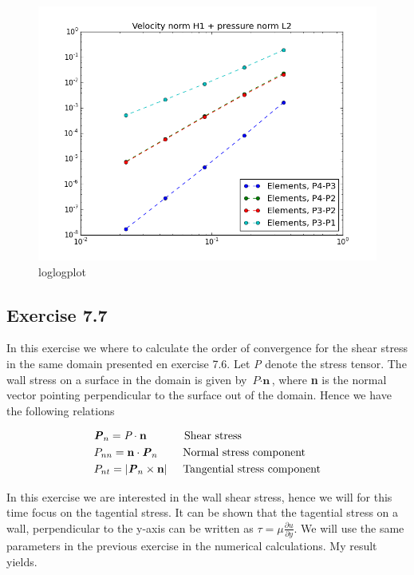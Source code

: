 \documentclass[a4paper,norsk]{article}
\begin{document}
\begin{figure}[h!]
	\centering
	\caption*{loglogplot}
	\includegraphics[scale=0.5]{comb.png}
\end{figure}

\newpage
\subsection{Exercise 7.7}
In this exercise we where to calculate the order of convergence for the shear stress in the same domain presented en exercise 7.6.
Let \textit{P} denote the stress tensor. The wall stress on a surface in the domain is given by $\textit{P} \cdot \textbf{n}$, where \textbf{n} is the normal vector
pointing perpendicular to the surface out of the domain. Hence we have the following relations

\begin{align*}
 &\textbf{\textit{P}}_n = \textit{P} \cdot \textbf{n} \hspace{12mm} \text{Shear stress} \\
	&P_{nn} = \textbf{n} \cdot \textbf{\textit{P}}_n \hspace{8mm} \text{Normal stress component} \\
	&P_{nt} = |\textbf{\textit{P}}_n \times \textbf{n}| \hspace{5mm} \text{Tangential stress component}
	\end{align*}

In this exercise we are interested in the wall shear stress, hence we will for this time focus on the tagential stress.
It can be shown that the tagential stress on a wall, perpendicular to the y-axis can be written as
$\tau = \mu \frac{\partial u}{\partial y}$. We will use the same parameters in the previous exercise in the numerical
calculations. My result yields.
\end{document}
